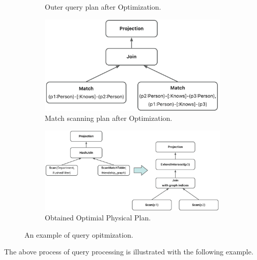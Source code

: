 \begin{figure}
\begin{subfigure}[b]{0.4\linewidth}
        \caption{Outer query plan after Optimization.}
        \label{fig:relational-plan-optimized}
    \end{subfigure}
    \begin{subfigure}[b]{0.4\linewidth}
        \centering
        \includegraphics[width=\linewidth]{./figures/converged-logical-plan-graph-optimized.png}
        \caption{Match scanning plan after Optimization.}
        \label{fig:graph-plan-optimized}
    \end{subfigure}
    \begin{subfigure}[b]{0.5\linewidth}
        \centering
        \includegraphics[width=\linewidth]{./figures/converged-physical-plan.png}
        \caption{Obtained Optimial Physical Plan.}
        \label{fig:physical-plan-optimized}
    \end{subfigure}
    \caption{An example of query opitmization.}
    \label{fig:query-grtree-example}
\end{figure}



The above process of query processing is illustrated with the following example.

